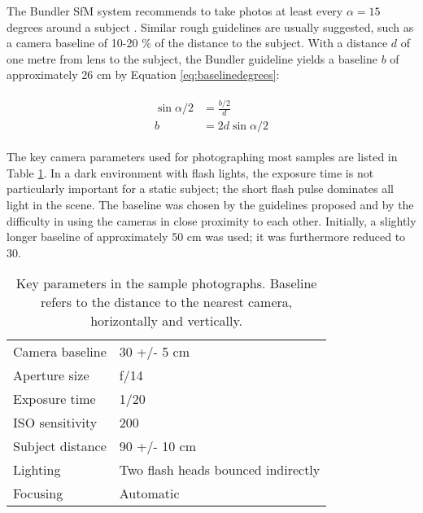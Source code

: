 

%
%


The Bundler SfM system recommends to take photos at least every $\alpha = 15$ degrees around a subject \cite{bundlerfaq}.
Similar rough guidelines are usually suggested, such as a camera baseline of 10-20 \% of the distance to the subject.
With a distance $d$ of one metre from lens to the subject, the Bundler guideline yields a baseline $b$ of approximately 26 cm by Equation \ref{eq:baselinedegrees}:

\begin{align} \begin{split} \label{eq:baselinedegrees}
	\sin \alpha/2 &= \frac{b/2}{d}\\
	b &= 2 d \sin \alpha/2
\end{split} \end{align}

The key camera parameters used for photographing most samples are listed in Table \ref{tab:sampleshotparams}.
In a dark environment with flash lights, the exposure time is not particularly important for a static subject; the short flash pulse dominates all light in the scene.
The baseline was chosen by the guidelines proposed and by the difficulty in using the cameras in close proximity to each other.
Initially, a slightly longer baseline of approximately 50 cm was used; it was furthermore reduced to 30.

\begin{table}[h]
	\centering
	\begin{tabular}{l l}
		Camera baseline & 30 +/- 5 cm\\
		Aperture size & f/14\\
		Exposure time & 1/20\\
		ISO sensitivity & 200\\
		Subject distance & 90 +/- 10 cm\\
		Lighting & Two flash heads bounced indirectly\\
		Focusing & Automatic\\
	\end{tabular}
	\caption{
		Key parameters in the sample photographs.
		Baseline refers to the distance to the nearest camera, horizontally and vertically.
	}
	\label{tab:sampleshotparams}
\end{table}

